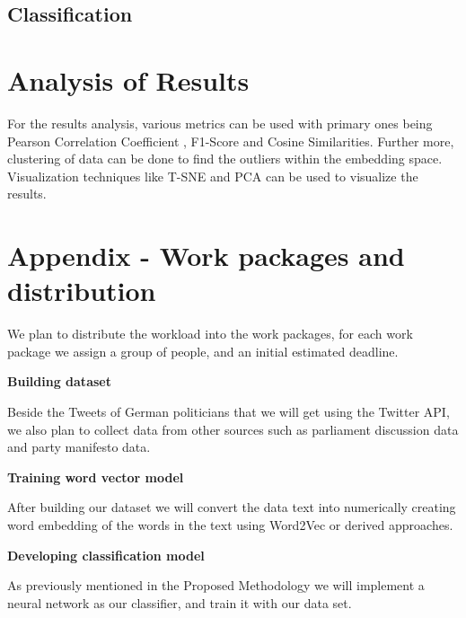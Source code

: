 \documentclass[10pt, oneside]{article}
\begin{document}
\begin{multicols}{2}
\subsection{Classification}


\section{Analysis of Results}

For the results analysis, various metrics can be used with primary ones being Pearson Correlation Coefficient \cite{Hauke2011}, F1-Score and Cosine Similarities. Further more, clustering of data can be done to find the outliers within the embedding space. Visualization techniques like T-SNE \cite{Laurens2008} and PCA \cite{Richardson2009} can be used to visualize the results. 

\end{multicols}
\newpage

\section{Appendix - Work packages and distribution}

We plan to distribute the workload into the work packages, for each work package we assign a group of people, and an initial estimated deadline.

\begin{flushleft}
\textbf{Building dataset}

Beside the Tweets of German politicians that we will get using the Twitter API, we also plan to collect data from other sources such as parliament discussion data and party manifesto data.
\end{flushleft}

\begin{flushleft}
\textbf{Training word vector model}

After building our dataset we will convert the data text into numerically creating word embedding of the words in the text using Word2Vec or derived approaches.
\end{flushleft}

\begin{flushleft}
\textbf{Developing classification model}

As previously mentioned in the Proposed Methodology we will implement a neural network as our classifier, and train it with our data set.
\end{flushleft}
\end{document}
